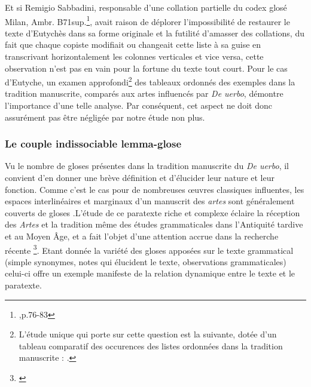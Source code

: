 \documentclass[a4paper, twoside, 12pt]{book}
\begin{document}
Et si Remigio Sabbadini, responsable d'une collation partielle du codex glosé Milan, Ambr. B71sup.\footnote{\cite{sabbadini1995opere},p.76-83}, avait raison de déplorer l'impossibilité de restaurer le texte d'Eutychès dans sa forme originale et la futilité d'amasser des collations, du fait que chaque copiste modifiait ou changeait cette liste à sa guise en transcrivant horizontalement les colonnes verticales et vice versa, cette observation n'est pas en vain pour la fortune du texte tout court. Pour le cas d'Eutyche, un examen approfondi\footnote{L'étude unique qui porte sur cette question est la suivante, dotée d'un tableau comparatif des occurences des listes ordonnées dans la tradition manuscrite : \cite{conduche2019miseenpage}.} des tableaux ordonnés des exemples dans la tradition manuscrite, comparés aux artes influencés par\textit{ De uerbo}, démontre l'importance d'une telle analyse.  Par conséquent, cet aspect ne doit donc assurément pas être négligée par notre étude non plus.


\subsubsection{Le couple indissociable lemma-glose}

Vu le nombre de gloses présentes dans la tradition manuscrite du \textit{De uerbo}, il convient d'en donner une brève définition et d'élucider leur nature et leur fonction. Comme c'est le cas pour de nombreuses œuvres classiques influentes, les espaces interlinéaires et marginaux d'un manuscrit des \textit{artes} sont généralement couverts de gloses .L'étude de ce paratexte riche et complexe éclaire la réception des \textit{Artes} et la tradition même des études grammaticales dans l'Antiquité tardive et au Moyen Âge, et a fait l'objet d'une attention accrue dans la recherche récente \footnote{\cite{monella2019digital}}. Etant donnée la variété des gloses apposées sur le texte grammatical (simple synonymes, notes qui élucident le texte, observations grammaticales) celui-ci offre un exemple manifeste de la relation dynamique entre le texte et le paratexte. \\
\end{document}
